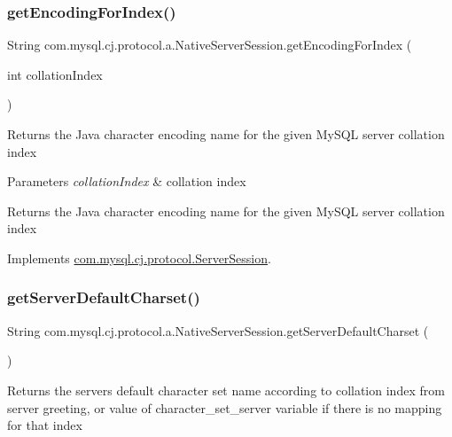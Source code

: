 \subsubsection{\texorpdfstring{get\+Encoding\+For\+Index()}{getEncodingForIndex()}}
{\footnotesize\ttfamily String com.\+mysql.\+cj.\+protocol.\+a.\+Native\+Server\+Session.\+get\+Encoding\+For\+Index (\begin{DoxyParamCaption}\item[{int}]{collation\+Index }\end{DoxyParamCaption})}

Returns the Java character encoding name for the given My\+S\+QL server collation index


\begin{DoxyParams}{Parameters}
{\em collation\+Index} & collation index \\
\hline
\end{DoxyParams}
\begin{DoxyReturn}{Returns}
the Java character encoding name for the given My\+S\+QL server collation index 
\end{DoxyReturn}


Implements \mbox{\hyperlink{interfacecom_1_1mysql_1_1cj_1_1protocol_1_1_server_session_a437ab4e5fb2cdd6cc66f206bce8688cd}{com.\+mysql.\+cj.\+protocol.\+Server\+Session}}.

\mbox{\label{classcom_1_1mysql_1_1cj_1_1protocol_1_1a_1_1_native_server_session_ad663008943ab8a1188490e3ba0befe95}} 
\subsubsection{\texorpdfstring{get\+Server\+Default\+Charset()}{getServerDefaultCharset()}}
{\footnotesize\ttfamily String com.\+mysql.\+cj.\+protocol.\+a.\+Native\+Server\+Session.\+get\+Server\+Default\+Charset (\begin{DoxyParamCaption}{ }\end{DoxyParamCaption})}

\begin{DoxyReturn}{Returns}
the server\textquotesingle{}s default character set name according to collation index from server greeting, or value of \textquotesingle{}character\+\_\+set\+\_\+server\textquotesingle{} variable if there is no mapping for that index 
\end{DoxyReturn}


